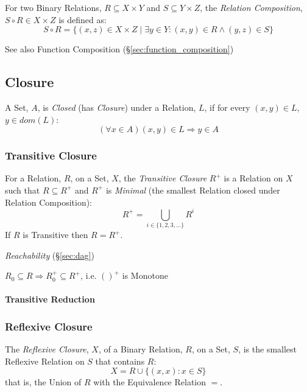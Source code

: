 For two Binary Relations, $R \subseteq X \times Y$ and $S \subseteq Y
\times Z$, the \emph{Relation Composition}, $S \circ R \in X \times Z$
is defined as:
\[
  S \circ R = \{(x,z) \in X \times Z \;|\;
  \exists y \in Y : (x,y) \in R \wedge (y,z) \in S \}
\]

See also Function Composition (\S\ref{sec:function_composition})



\subsection{Closure}\label{sec:closure}

A Set, $A$, is \emph{Closed} (has \emph{Closure}) under a Relation,
$L$, if for every $(x,y) \in L$, $y \in dom(L)$:
\[
  (\forall x \in A) (x,y) \in L \Rightarrow y \in A
\]



\subsubsection{Transitive Closure}\label{sec:transitive_closure}

For a Relation, $R$, on a Set, $X$, the \emph{Transitive Closure}
$R^+$ is a Relation on $X$ such that $R \subseteq R^+$ and $R^+$ is
\emph{Minimal} (the smallest Relation closed under Relation
Composition):
\[
  R^+ = \bigcup_{i \in \{1,2,3,...\}} R^i
\]
If $R$ is Transitive then $R = R^+$.

\emph{Reachability} (\S\ref{sec:dag})

$R_0 \subseteq R \Rightarrow R_0^+ \subseteq R^+$, i.e. $()^+$ is
Monotone \cite{aczel88}



\paragraph{Transitive Reduction}\label{sec:transitive_reduction}\hfill



\subsubsection{Reflexive Closure}\label{sec:reflexive_closure}

The \emph{Reflexive Closure}, $X$, of a Binary Relation, $R$, on a
Set, $S$, is the smallest Reflexive Relation on $S$ that contains $R$:
\[
  X = R \cup \{(x,x) : x \in S\}
\]
that is, the Union of $R$ with the Equivalence Relation $=$.

